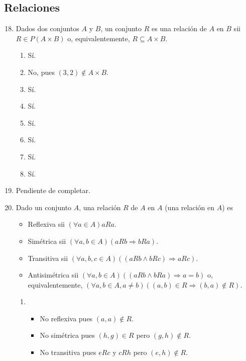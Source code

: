 \subsection*{Relaciones}

\begin{enumerate}
\setcounter{enumi}{17}

\item %
  Dados dos conjuntos $A$ y $B$, un conjunto $R$ es una relación de $A$ en $B$ sii $R \in P(A \times B)$ o, equivalentemente, $R \subseteq A \times B$.
  \begin{multicols}{3}
  \begin{enumerate}
  \item Sí.
  \item No, pues $(3,2) \notin A \times B$.
  \item Sí.
  \item Sí.
  \item Sí.
  \item Sí.
  \item Sí.
  \item Sí.
  \end{enumerate}
  \end{multicols}
\item %
  Pendiente de completar.
\item %
  Dado un conjunto $A$, una relación $R$ de $A$ en $A$ (una relación en $A$) es
  \begin{itemize}
  \item Reflexiva sii $(\forall a \in A) a R a$.
  \item Simétrica sii $(\forall a,b \in A) (a R b \Rightarrow b R a)$.
  \item Transitiva sii $(\forall a,b,c \in A) ((a R b \wedge b R c) \Rightarrow a R c)$.
  \item Antisimétrica sii $(\forall a,b \in A) ((aRb \wedge bRa) \Rightarrow a = b)$\newline
  o, equivalentemente, $(\forall a,b \in A, a \neq b) ((a,b) \in R \Rightarrow (b,a) \notin R)$.
  \end{itemize}
  \begin{enumerate}
  \item
    \begin{itemize}
      \item No reflexiva pues $(a,a) \notin R$.
      \item No simétrica pues $(h,g) \in R$ pero $(g,h) \notin R$.
      \item No transitiva pues $e R c$ y $c R h$ pero $(e,h) \notin R$.

\end{itemize}
\end{enumerate}
\end{enumerate}
